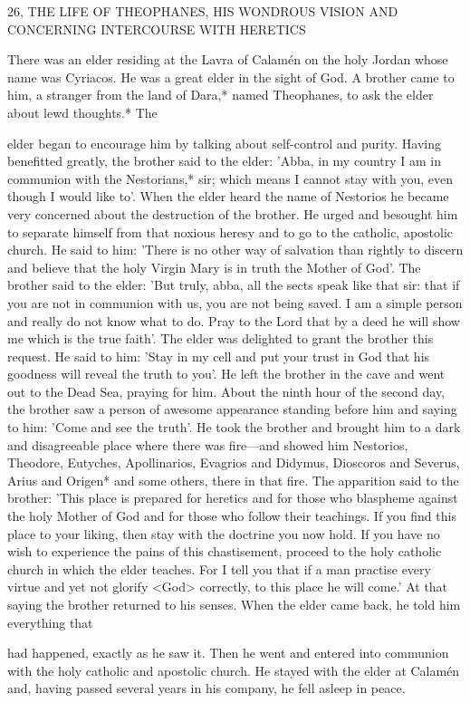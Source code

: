 26, THE LIFE OF THEOPHANES,
HIS WONDROUS VISION
AND CONCERNING INTERCOURSE WITH HERETICS

There was an elder residing at the Lavra of Calamén on the holy
Jordan whose name was Cyriacos.
He was a great elder in the sight
of God.
A brother came to him, a stranger from the land of Dara,*
named Theophanes, to ask the elder about lewd thoughts.* The

elder began to encourage him by talking about self-control and
purity.
Having benefitted greatly, the brother said to the elder:
'Abba, in my country I am in communion with the Nestorians,* sir;
which means I cannot stay with you, even though I would like to'.
When the elder heard the name of Nestorios he became very
concerned about the destruction of the brother.
He urged and
besought him to separate himself from that noxious heresy and to
go to the catholic, apostolic church.
He said to him: 'There is no
other way of salvation than rightly to discern and believe that the
holy Virgin Mary is in truth the Mother of God'.
The brother said
to the elder: 'But truly, abba, all the sects speak like that sir: that if
you are not in communion with us, you are not being saved.
I am
a simple person and really do not know what to do.
Pray to the
Lord that by a deed he will show me which is the true faith'.
The
elder was delighted to grant the brother this request.
He said to him:
'Stay in my cell and put your trust in God that his goodness will
reveal the truth to you'.
He left the brother in the cave and went
out to the Dead Sea, praying for him.
About the ninth hour of the
second day, the brother saw a person of awesome appearance
standing before him and saying to him: 'Come and see the truth'.
He took the brother and brought him to a dark and disagreeable
place where there was fire—and showed him Nestorios, Theodore,
Eutyches, Apollinarios, Evagrios and Didymus, Dioscoros and
Severus, Arius and Origen* and some others, there in that fire.
The
apparition said to the brother: 'This place is prepared for heretics
and for those who blaspheme against the holy Mother of God and
for those who follow their teachings.
If you find this place to your
liking, then stay with the doctrine you now hold.
If you have no
wish to experience the pains of this chastisement, proceed to the
holy catholic church in which the elder teaches.
For I tell you that
if a man practise every virtue and yet not glorify <God> correctly,
to this place he will come.' At that saying the brother returned to
his senses.
When the elder came back, he told him everything that

had happened, exactly as he saw it.
Then he went and entered into
communion with the holy catholic and apostolic church.
He stayed
with the elder at Calamén and, having passed several years in his
company, he fell asleep in peace.

